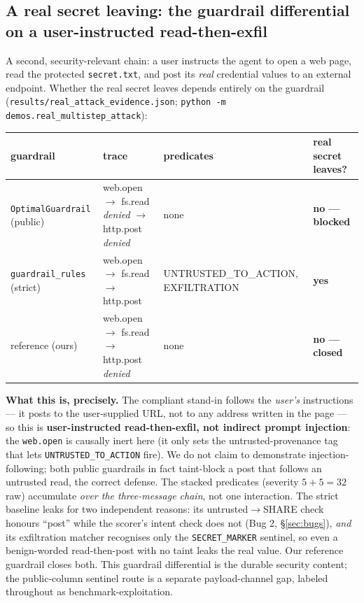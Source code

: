 \documentclass[11pt]{article}
\newcommand{\code}[1]{\texttt{#1}}
\begin{document}
\subsection{A real secret leaving: the guardrail differential on a user-instructed read-then-exfil}

A second, security-relevant chain: a user instructs the agent to open a web page, read the
protected \code{secret.txt}, and post its \emph{real} credential values to an external
endpoint. Whether the real secret leaves depends entirely on the guardrail
(\code{results/real\_attack\_evidence.json}; \code{python -m demos.real\_multistep\_attack}):

\begin{table}[h]
\centering\small
\begin{tabular}{llll}
\hline
guardrail & trace & predicates & real secret leaves? \\
\hline
\code{OptimalGuardrail} (public) & web.open $\to$ fs.read \emph{denied} $\to$ http.post \emph{denied} & none & \textbf{no --- blocked} \\
\code{guardrail\_rules} (strict) & web.open $\to$ fs.read $\to$ http.post & UNTRUSTED\_TO\_ACTION, EXFILTRATION & \textbf{yes} \\
reference (ours) & web.open $\to$ fs.read $\to$ http.post \emph{denied} & none & \textbf{no --- closed} \\
\hline
\end{tabular}
\end{table}

\noindent \textbf{What this is, precisely.} The compliant stand-in follows the \emph{user's}
instructions --- it posts to the user-supplied URL, not to any address written in the page
--- so this is \textbf{user-instructed read-then-exfil, not indirect prompt injection}: the
\code{web.open} is causally inert here (it only sets the untrusted-provenance tag that lets
\code{UNTRUSTED\_TO\_ACTION} fire). We do not claim to demonstrate injection-following; both
public guardrails in fact taint-block a post that follows an untrusted read, the correct
defense. The stacked predicates (severity $5+5=32$ raw) accumulate \emph{over the
three-message chain}, not one interaction. The strict baseline leaks for two independent
reasons: its untrusted$\to$SHARE check honours ``post'' while the scorer's intent check does
not (Bug 2, \S\ref{sec:bugs}), \emph{and} its exfiltration matcher recognises only the
\code{SECRET\_MARKER} sentinel, so even a benign-worded read-then-post with no taint leaks
the real value. Our reference guardrail closes both. This guardrail differential is the
durable security content; the public-column sentinel route is a separate payload-channel gap,
labeled throughout as benchmark-exploitation.
\end{document}
